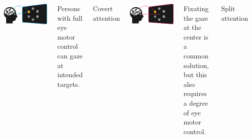 \documentclass[25pt, a0paper, landscape]{tikzposter}
\begin{document}
\begin{columns}
{		\begin{minipage}{.48\linewidth}
			\includegraphics[width=\linewidth]{figures/attention_overt.pdf}
		\end{minipage}%
		\hfill%
		\begin{minipage}{.48\linewidth}
			Persons with full eye motor control can gaze at intended targets.
		\end{minipage}%
		\bigskip
		\bigskip

		\begin{tcolorbox}[sharp corners=all,
				colback=GeoDataViz_magenta,coltext=white,
				fontupper=\bfseries,boxrule=0mm,boxsep=5mm,
			]
			Covert attention
		\end{tcolorbox}


		\begin{minipage}{.48\linewidth}
			\includegraphics[width=\linewidth]{figures/attention_covert.pdf}
		\end{minipage}%
		\hfill%
		\begin{minipage}{.48\linewidth}
			Fixating the gaze at the center is a common solution, but this also requires a degree of eye motor control.
		\end{minipage}%
		\bigskip
		\bigskip

		\begin{tcolorbox}[sharp corners=all,
				colback=GeoDataViz_green,coltext=white,
				fontupper=\bfseries,boxrule=0mm,boxsep=5mm,
			]
			Split attention
		\end{tcolorbox}


}
\end{columns}
\end{document}
